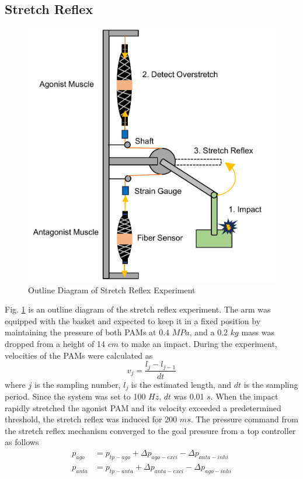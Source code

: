 \subsection{Stretch Reflex}
\begin{figure}[t]
    \centering
    \includegraphics[width=0.7\columnwidth]{fig/reflex_experiment.pdf}
    \caption{Outline Diagram of Stretch Reflex Experiment}
    \label{fig:reflex_equipment}
 \end{figure}
Fig. \ref{fig:reflex_equipment} is an outline diagram of the stretch reflex experiment.
The arm was equipped with the basket and expected to keep it in a fixed position by maintaining the pressure of both PAMs at 0.4 $\si{MPa}$, and a 0.2 $\si{kg}$ mass was dropped from a height of 14 $\si{cm}$ to make an impact. During the experiment, velocities of the PAMs were calculated as
\begin{equation}
    \label{eq:velocity}
    v_j = \frac{l_j -l_{j-1}}{dt}
\end{equation}
where $j$ is the sampling number, $l_j$ is the estimated length, and $dt$ is the sampling period.
Since the system was set to 100 $\si{Hz}$, $dt$ was 0.01 $\si{s}$.
When the impact rapidly stretched the agonist PAM and its velocity exceeded a predetermined threshold, the stretch reflex was induced for 200 $\si{ms}$. The pressure command from the stretch reflex mechanism converged to the goal pressure from a top controller as follows
\begin{align}
    \label{eq:command_pressure}
    p_{ago} &= p_{tp - ago} + \Delta p_{ago - exci} - \Delta p_{anta - inhi} \\
    p_{anta} &= p_{tp - anta} + \Delta p_{anta - exci} - \Delta p_{ago - inhi}
    \label{eq:command_pressure_2}
\end{align}
